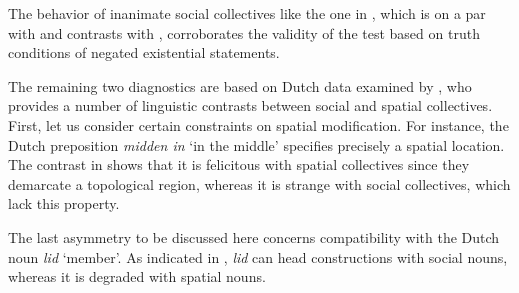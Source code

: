 \documentclass[output=paper]{langscibook}
\begin{document}
    \ea\label{wan:ex:entailment-bouquet}		
		\label{wan:ex:entailment-bouquet1} 
		\label{wan:ex:entailment-bouquet2}
    \z	
    \z

\noindent The behavior of inanimate social collectives like the one in , which is on a par with  and contrasts with , corroborates the validity of the test based on truth conditions of negated existential statements.

	\ea\label{wan:ex:entailment-fleet}
	\label{wan:ex:entailment-fleet1}
	\label{wan:ex:entailment-fleet2}
    \z
    \z

\noindent The remaining two diagnostics are based on Dutch data examined by \citet{zwarts2020contiguity}, who provides a number of linguistic contrasts between social and spatial collectives. First, let us consider certain constraints on spatial modification. For instance, the Dutch preposition \textit{midden in} `in the middle' specifies precisely a spatial location. The contrast in  shows that it is felicitous with spatial collectives since they demarcate a topological region, whereas it is strange with social collectives, which lack this property.	
	
	\ea\label{wan:ex:spatial} 
    \z	
    \z

\noindent The last asymmetry to be discussed here concerns compatibility with the Dutch noun \textit{lid} `member'. As indicated in , \textit{lid} can head constructions with social nouns, whereas it is degraded with spatial nouns.
	
	\ea\label{wan:ex:member} 
    \z	
    \z
\end{document}
